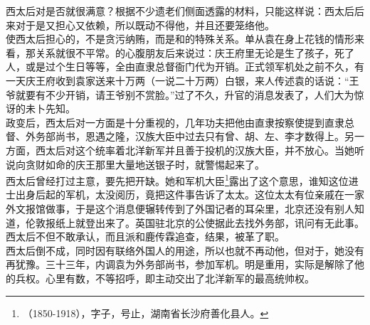 西太后对是否就很满意？根据不少遗老们侧面透露的材料，只能这样说：西太后后来对于是又担心又依赖，所以既动不得他，并且还要笼络他。\\

使西太后担心的，不是贪污纳贿，而是和的特殊关系。单从袁在身上花钱的情形来看，那关系就很不平常。的心腹朋友后来说过：庆王府里无论是生了孩子，死了人，或是过个生日等等，全由直隶总督衙门代为开销。正式领军机处之前不久，有一天庆王府收到袁家送来十万两（一说二十万两）白银，来人传述袁的话说：“王爷就要有不少开销，请王爷别不赏脸。”过了不久，升官的消息发表了，人们大为惊讶的未卜先知。\\

政变后，西太后对一方面是十分重视的，几年功夫把他由直隶按察使提到直隶总督、外务部尚书，恩遇之隆，汉族大臣中过去只有曾、胡、左、李才数得上。另一方面，西太后对这个统率着北洋新军并且善于投机的汉族大臣，并不放心。当她听说向贪财如命的庆王那里大量地送银子时，就警惕起来了。\\

西太后曾经打过主意，要先把开缺。她和军机大臣\footnote{（1850-1918），字子，号止，湖南省长沙府善化县人。}露出了这个意思，谁知这位进士出身后起的军机，太没阅历，竟把这件事告诉了太太。这位太太有位亲戚在一家外文报馆做事，于是这个消息便辗转传到了外国记者的耳朵里，北京还没有别人知道，伦敦报纸上就登出来了。英国驻北京的公使据此去找外务部，讯问有无此事。西太后不但不敢承认，而且派和鹿传霖追查，结果，被革了职。\\

西太后倒不成，同时因有联络外国人的用途，所以也就不再动他，但对于，她没有再犹豫。三十三年，内调袁为外务部尚书，参加军机。明是重用，实际是解除了他的兵权。心里有数，不等招呼，即主动交出了北洋新军的最高统帅权。\\

